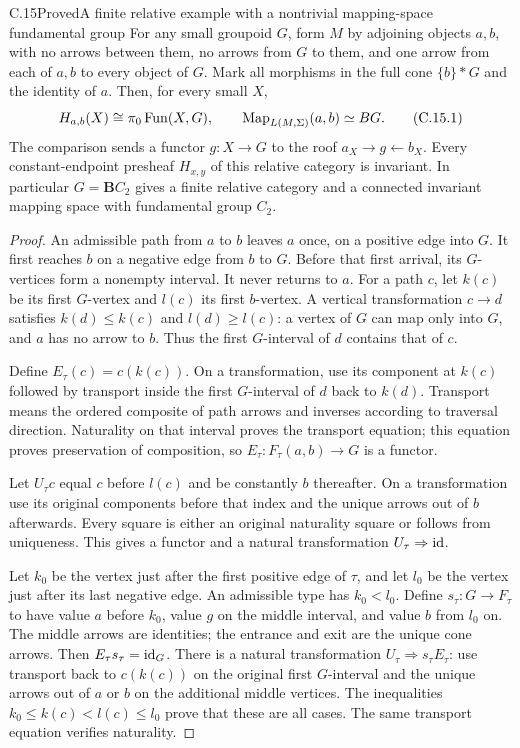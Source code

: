 \begin{claim}{C.15}{Proved}{A finite relative example with a nontrivial mapping-space fundamental group}
For any small groupoid $G$, form $M$ by adjoining objects $a,b$, with no arrows between them, no arrows from $G$ to them, and one arrow from each of $a,b$ to every object of $G$. Mark all morphisms in the full cone $\{b\}*G$ and the identity of $a$. Then, for every small $X$,
\[
 H_{a,b}(X)\cong\pi_0\operatorname{Fun}(X,G),\qquad
 \operatorname{Map}_{L(M,\Sigma)}(a,b)\simeq BG. \tag{C.15.1}
\]
The comparison sends a functor $g:X\to G$ to the roof $a_X\to g\leftarrow b_X$. Every constant-endpoint presheaf $H_{x,y}$ of this relative category is invariant. In particular $G=\mathbf BC_2$ gives a finite relative category and a connected invariant mapping space with fundamental group $C_2$.
\end{claim}
\begin{proof}
An admissible path from $a$ to $b$ leaves $a$ once, on a positive edge into $G$. It first reaches $b$ on a negative edge from $b$ to $G$. Before that first arrival, its $G$-vertices form a nonempty interval. It never returns to $a$. For a path $c$, let $k(c)$ be its first $G$-vertex and $l(c)$ its first $b$-vertex. A vertical transformation $c\to d$ satisfies $k(d)\leq k(c)$ and $l(d)\geq l(c)$: a vertex of $G$ can map only into $G$, and $a$ has no arrow to $b$. Thus the first $G$-interval of $d$ contains that of $c$.

Define $E_\tau(c)=c(k(c))$. On a transformation, use its component at $k(c)$ followed by transport inside the first $G$-interval of $d$ back to $k(d)$. Transport means the ordered composite of path arrows and inverses according to traversal direction. Naturality on that interval proves the transport equation; this equation proves preservation of composition, so $E_\tau:F_\tau(a,b)\to G$ is a functor.

Let $U_\tau c$ equal $c$ before $l(c)$ and be constantly $b$ thereafter. On a transformation use its original components before that index and the unique arrows out of $b$ afterwards. Every square is either an original naturality square or follows from uniqueness. This gives a functor and a natural transformation $U_\tau\Rightarrow\mathrm{id}$.

Let $k_0$ be the vertex just after the first positive edge of $\tau$, and let $l_0$ be the vertex just after its last negative edge. An admissible type has $k_0<l_0$. Define $s_\tau:G\to F_\tau$ to have value $a$ before $k_0$, value $g$ on the middle interval, and value $b$ from $l_0$ on. The middle arrows are identities; the entrance and exit are the unique cone arrows. Then $E_\tau s_\tau=\mathrm{id}_G$. There is a natural transformation $U_\tau\Rightarrow s_\tau E_\tau$: use transport back to $c(k(c))$ on the original first $G$-interval and the unique arrows out of $a$ or $b$ on the additional middle vertices. The inequalities $k_0\leq k(c)<l(c)\leq l_0$ prove that these are all cases. The same transport equation verifies naturality.


\end{proof}
